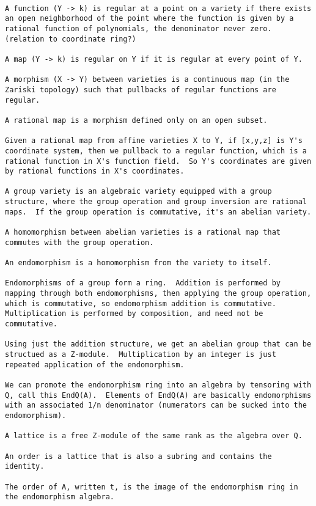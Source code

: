 {\small\begin{verbatim}

A function (Y -> k) is regular at a point on a variety if there exists
an open neighborhood of the point where the function is given by a
rational function of polynomials, the denominator never zero.
(relation to coordinate ring?)

A map (Y -> k) is regular on Y if it is regular at every point of Y.

A morphism (X -> Y) between varieties is a continuous map (in the
Zariski topology) such that pullbacks of regular functions are
regular.

A rational map is a morphism defined only on an open subset.

Given a rational map from affine varieties X to Y, if [x,y,z] is Y's
coordinate system, then we pullback to a regular function, which is a
rational function in X's function field.  So Y's coordinates are given
by rational functions in X's coordinates.

A group variety is an algebraic variety equipped with a group
structure, where the group operation and group inversion are rational
maps.  If the group operation is commutative, it's an abelian variety.

A homomorphism between abelian varieties is a rational map that
commutes with the group operation.

An endomorphism is a homomorphism from the variety to itself.

Endomorphisms of a group form a ring.  Addition is performed by
mapping through both endomorphisms, then applying the group operation,
which is commutative, so endomorphism addition is commutative.
Multiplication is performed by composition, and need not be
commutative.

Using just the addition structure, we get an abelian group that can be
structued as a Z-module.  Multiplication by an integer is just
repeated application of the endomorphism.

We can promote the endomorphism ring into an algebra by tensoring with
Q, call this EndQ(A).  Elements of EndQ(A) are basically endomorphisms
with an associated 1/n denominator (numerators can be sucked into the
endomorphism).

A lattice is a free Z-module of the same rank as the algebra over Q.

An order is a lattice that is also a subring and contains the identity.

The order of A, written t, is the image of the endomorphism ring in
the endomorphism algebra.


\end{verbatim}}
